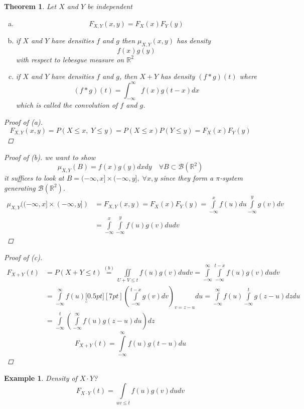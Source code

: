 \documentclass[12pt]{article}
\def\RR{\mathbb{R}}
\newtheorem{theorem}{Theorem}[section]
\newtheorem{example}{Example}[section]
\begin{document}
\begin{theorem}
Let $X$ and $Y$ be independent
\begin{enumerate}[(a)]
\item \[F_{X,Y}(x,y) = F_X(x)F_Y(y)\]
\item if $X$ and $Y$ have densities $f$ and $g$ then $\mu_{X,Y}(x,y)$ has density 
\[f(x)g(y)\]
with respect to lebesgue measure on $\RR^2$
\item  if $X$ and $Y$ have densities $f$ and $g$, then $X +Y$ has density $(f*g)(t)$ where
\[(f*g)(t)=\int_{-\infty}^{\infty}f(x)g(t-x)dx \]
which is called the convolution of $f$ and $g$.
\end{enumerate}
\begin{proof}[Proof of (a)]
\[F_{X,Y}(x,y) = P(X\leq x , \; Y \leq y) = P(X\leq x)P(Y \leq y) = F_X(x)F_Y(y)\]
\end{proof}
\begin{proof}[Proof of (b)]
we want to show 
\[\mu_{X, Y}(B) = f(x)g(y)dxdy \quad \forall B \subset \mathcal{B}(\RR^2)\]
it suffices to look at $B= (-\infty,x]\times (- \infty, y], \; \forall x,y$ since they form a $\pi$-system generating $\mathcal{B}(\RR^2)$.
\begin{align*} \mu_{X,Y}((-\infty,x]\times (- \infty, y]) &= F_{X,Y}(x,y) = F_X(x)F_Y(y) = \int\limits_{-\infty}^{x}f(u)du\int\limits_{-\infty}^{y}g(v)dv \\ &= \int\limits_{-\infty}^{x}\int\limits_{-\infty}^{y}f(u)g(v)dudv\end{align*}
\end{proof}
\begin{proof}[Proof of (c)]
\begin{align*} F_{X+Y}(t) &= P(X+Y \leq t) \overset{(b)}{=}\iint\limits_{U+V \leq t}f(u)g(v)dudv = \int\limits_{-\infty}^{\infty}\int\limits_{-\infty}^{t-x}f(u)g(v)dudv \\ &= \int\limits_{-\infty}^{\infty}f(u)\underbracket[0.5pt][7pt]{\left(\int\limits_{-\infty}^{t-x}g(v)dv\right)}_{v=z-u}du =  \int\limits_{-\infty}^{\infty}f(u)\int\limits_{-\infty}^{t}g(z-u)dzdu \\ &=\int\limits_{-\infty}^{t}\left(\int\limits_{-\infty}^{\infty}f(u)g(z-u)du\right)dz \end{align*}
\[ F_{X+Y}(t) = \int\limits_{-\infty}^{\infty}f(u)g(t-u)du\]
\end{proof}
\end{theorem}

\begin{example}
Density of $X\cdot Y$?
\[ F_{X\cdot Y}(t) = \int\limits_{uv\leq t}f(u)g(v)dudv\]
\end{example}
\end{document}
